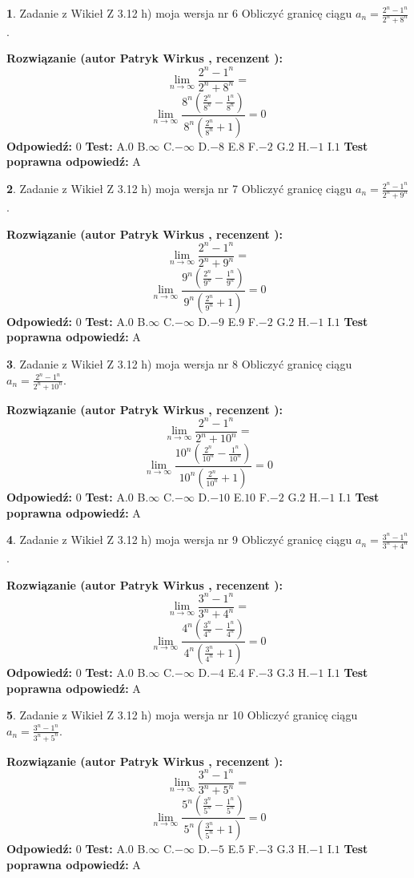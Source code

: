 \documentclass[12pt, a4paper]{article}
\theoremstyle{definition} %
\newtheorem{zad}{}
\newcommand{\zadStart}[1]{\begin{zad}#1\newline}
\newcommand{\zadStop}{\end{zad}}
\newcommand{\rozwStart}[2]{\noindent \textbf{Rozwiązanie (autor #1 , recenzent #2): }\newline}
\newcommand{\rozwStop}{\newline}
\newcommand{\odpStart}{\noindent \textbf{Odpowiedź:}\newline}
\newcommand{\odpStop}{\newline}
\newcommand{\testStart}{\noindent \textbf{Test:}\newline}
\newcommand{\testStop}{\newline}
\newcommand{\kluczStart}{\noindent \textbf{Test poprawna odpowiedź:}\newline}
\newcommand{\kluczStop}{\newline}
\begin{document}
\zadStart{Zadanie z Wikieł Z 3.12 h) moja wersja nr 6}
Obliczyć granicę ciągu $a_{n}=\frac{2^{n} - 1^{n}}{2^{n} + 8^{n}}$.
\zadStop
\rozwStart{Patryk Wirkus}{}
$$\lim\limits_{n\to\infty}\frac{2^{n} - 1^{n}}{2^{n} + 8^{n}}=$$
$$\lim\limits_{n\to\infty}\frac{8^{n}(\frac{2^{n}}{8^{n}} - \frac{1^{n}}{8^{n}})}{8^{n}(\frac{2^{n}}{8^{n}} + 1)} = 0$$
\rozwStop
\odpStart
$0$
\odpStop
\testStart
A.$0$
B.$\infty$
C.$-\infty$
D.$-8$
E.$8$
F.$-2$
G.$2$
H.$-1$
I.$1$
\testStop
\kluczStart
A
\kluczStop



\zadStart{Zadanie z Wikieł Z 3.12 h) moja wersja nr 7}
Obliczyć granicę ciągu $a_{n}=\frac{2^{n} - 1^{n}}{2^{n} + 9^{n}}$.
\zadStop
\rozwStart{Patryk Wirkus}{}
$$\lim\limits_{n\to\infty}\frac{2^{n} - 1^{n}}{2^{n} + 9^{n}}=$$
$$\lim\limits_{n\to\infty}\frac{9^{n}(\frac{2^{n}}{9^{n}} - \frac{1^{n}}{9^{n}})}{9^{n}(\frac{2^{n}}{9^{n}} + 1)} = 0$$
\rozwStop
\odpStart
$0$
\odpStop
\testStart
A.$0$
B.$\infty$
C.$-\infty$
D.$-9$
E.$9$
F.$-2$
G.$2$
H.$-1$
I.$1$
\testStop
\kluczStart
A
\kluczStop



\zadStart{Zadanie z Wikieł Z 3.12 h) moja wersja nr 8}
Obliczyć granicę ciągu $a_{n}=\frac{2^{n} - 1^{n}}{2^{n} + 10^{n}}$.
\zadStop
\rozwStart{Patryk Wirkus}{}
$$\lim\limits_{n\to\infty}\frac{2^{n} - 1^{n}}{2^{n} + 10^{n}}=$$
$$\lim\limits_{n\to\infty}\frac{10^{n}(\frac{2^{n}}{10^{n}} - \frac{1^{n}}{10^{n}})}{10^{n}(\frac{2^{n}}{10^{n}} + 1)} = 0$$
\rozwStop
\odpStart
$0$
\odpStop
\testStart
A.$0$
B.$\infty$
C.$-\infty$
D.$-10$
E.$10$
F.$-2$
G.$2$
H.$-1$
I.$1$
\testStop
\kluczStart
A
\kluczStop



\zadStart{Zadanie z Wikieł Z 3.12 h) moja wersja nr 9}
Obliczyć granicę ciągu $a_{n}=\frac{3^{n} - 1^{n}}{3^{n} + 4^{n}}$.
\zadStop
\rozwStart{Patryk Wirkus}{}
$$\lim\limits_{n\to\infty}\frac{3^{n} - 1^{n}}{3^{n} + 4^{n}}=$$
$$\lim\limits_{n\to\infty}\frac{4^{n}(\frac{3^{n}}{4^{n}} - \frac{1^{n}}{4^{n}})}{4^{n}(\frac{3^{n}}{4^{n}} + 1)} = 0$$
\rozwStop
\odpStart
$0$
\odpStop
\testStart
A.$0$
B.$\infty$
C.$-\infty$
D.$-4$
E.$4$
F.$-3$
G.$3$
H.$-1$
I.$1$
\testStop
\kluczStart
A
\kluczStop



\zadStart{Zadanie z Wikieł Z 3.12 h) moja wersja nr 10}
Obliczyć granicę ciągu $a_{n}=\frac{3^{n} - 1^{n}}{3^{n} + 5^{n}}$.
\zadStop
\rozwStart{Patryk Wirkus}{}
$$\lim\limits_{n\to\infty}\frac{3^{n} - 1^{n}}{3^{n} + 5^{n}}=$$
$$\lim\limits_{n\to\infty}\frac{5^{n}(\frac{3^{n}}{5^{n}} - \frac{1^{n}}{5^{n}})}{5^{n}(\frac{3^{n}}{5^{n}} + 1)} = 0$$
\rozwStop
\odpStart
$0$
\odpStop
\testStart
A.$0$
B.$\infty$
C.$-\infty$
D.$-5$
E.$5$
F.$-3$
G.$3$
H.$-1$
I.$1$
\testStop
\kluczStart
A
\kluczStop
\end{document}
